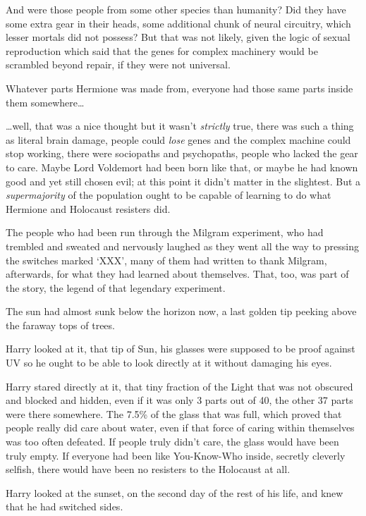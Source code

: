 And were those people from some other species than humanity? Did they have some extra gear in their heads, some additional chunk of neural circuitry, which lesser mortals did not possess? But that was not likely, given the logic of sexual reproduction which said that the genes for complex machinery would be scrambled beyond repair, if they were not universal.

Whatever parts Hermione was made from, everyone had those same parts inside them somewhere{\ldots}

{\ldots}well, that was a nice thought but it wasn't \emph{strictly} true, there was such a thing as literal brain damage, people could \emph{lose} genes and the complex machine could stop working, there were sociopaths and psychopaths, people who lacked the gear to care. Maybe Lord Voldemort had been born like that, or maybe he had known good and yet still chosen evil; at this point it didn't matter in the slightest. But a \emph{supermajority} of the population ought to be capable of learning to do what Hermione and Holocaust resisters did.

The people who had been run through the Milgram experiment, who had trembled and sweated and nervously laughed as they went all the way to pressing the switches marked `XXX', many of them had written to thank Milgram, afterwards, for what they had learned about themselves. That, too, was part of the story, the legend of that legendary experiment.

The sun had almost sunk below the horizon now, a last golden tip peeking above the faraway tops of trees.

Harry looked at it, that tip of Sun, his glasses were supposed to be proof against UV so he ought to be able to look directly at it without damaging his eyes.

Harry stared directly at it, that tiny fraction of the Light that was not obscured and blocked and hidden, even if it was only 3 parts out of 40, the other 37 parts were there somewhere. The 7.5\% of the glass that was full, which proved that people really did care about water, even if that force of caring within themselves was too often defeated. If people truly didn't care, the glass would have been truly empty. If everyone had been like You-Know-Who inside, secretly cleverly selfish, there would have been no resisters to the Holocaust at all.

Harry looked at the sunset, on the second day of the rest of his life, and knew that he had switched sides.

